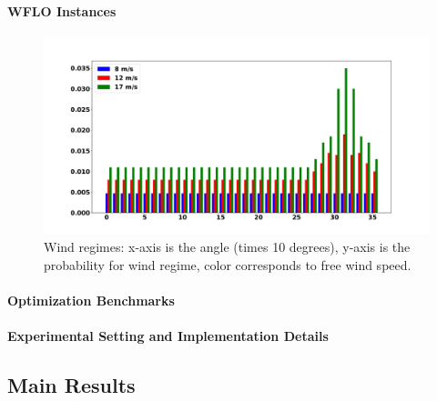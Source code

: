 \documentclass[preprint,12pt]{elsarticle}
\begin{document}
\paragraph{WFLO Instances}
\begin{figure}[t]
	\centering
	\includegraphics[scale = 0.3]{prob_wind_pdf.pdf}
	
	\caption{Wind regimes: x-axis is the angle (times 10 degrees), y-axis is the probability for wind regime, color corresponds to free wind speed.}\label{fig:prob_wind}
\end{figure}

\paragraph{Optimization Benchmarks}

\paragraph{Experimental Setting and Implementation Details}

\subsection{Main Results}
\end{document}
